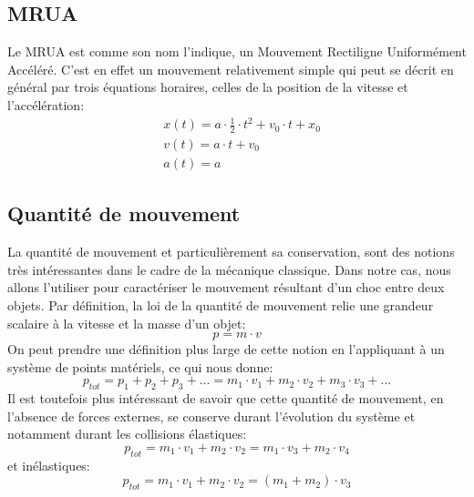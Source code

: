 \subsection{MRUA}
Le MRUA est comme son nom l'indique, un Mouvement Rectiligne Uniformément Accéléré. C'est en effet un mouvement relativement simple qui peut se décrit en général par trois équations horaires, celles de la position de la vitesse et l'accélération:
\begin{align}
& x(t) = a\cdot \frac{1}{2} \cdot t^2 + v_0 \cdot t + x_0 \\
& v(t) = a \cdot t + v_0 \\
& a(t) = a
\end{align}

\subsection{Quantité de mouvement}
La quantité de mouvement et particulièrement sa conservation, sont des notions très intéressantes dans le cadre de la mécanique classique. Dans notre cas, nous allons l'utiliser pour caractériser le mouvement résultant d'un choc entre deux objets.
Par définition, la loi de la quantité de mouvement relie une grandeur scalaire à la vitesse et la masse d'un objet:
\begin{equation}
p = m \cdot v
\end{equation}
On peut prendre une définition plus large de cette notion en l'appliquant à un système de points matériels, ce qui nous donne:
\begin{equation}
p_{tot} = p_1 + p_2 + p_3 + ... = m_1 \cdot v_1 + m_2 \cdot v_2 + m_3 \cdot v_3 + ...
\end{equation}
Il est toutefois plus intéressant de savoir que cette quantité de mouvement, en l'absence de forces externes, se conserve durant l'évolution du système et notamment durant les collisions élastiques:
\begin{equation}
p_{tot} = m_1 \cdot v_1 + m_2 \cdot v_2 = m_1 \cdot v_3 + m_2 \cdot v_4
\end{equation}
et inélastiques:
\begin{equation}
p_{tot} = m_1 \cdot v_1 + m_2 \cdot v_2 = (m_1 + m_2) \cdot v_3
\end{equation}